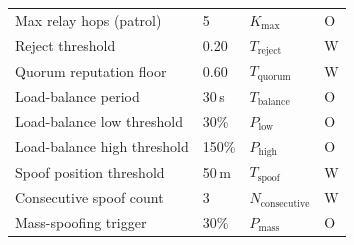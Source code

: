 \documentclass[journal,10pt,twocolumn]{IEEEtran}
\begin{document}
\begin{table}[t]
{\begin{tabular}{llll}
Max relay hops (patrol) & 5 & $K_\text{max}$ & O \\
Reject threshold & 0.20 & $T_\text{reject}$ & W \\
Quorum reputation floor & 0.60 & $T_\text{quorum}$ & W \\
Load-balance period & 30\,s & $T_\text{balance}$ & O \\
Load-balance low threshold & 30\% & $P_\text{low}$ & O \\
Load-balance high threshold & 150\% & $P_\text{high}$ & O \\
Spoof position threshold & 50\,m & $T_\text{spoof}$ & W \\
Consecutive spoof count & 3 & $N_\text{consecutive}$ & W \\
Mass-spoofing trigger & 30\% & $P_\text{mass}$ & O \\
\bottomrule
\end{tabular}%
}
\end{table}
\end{document}
